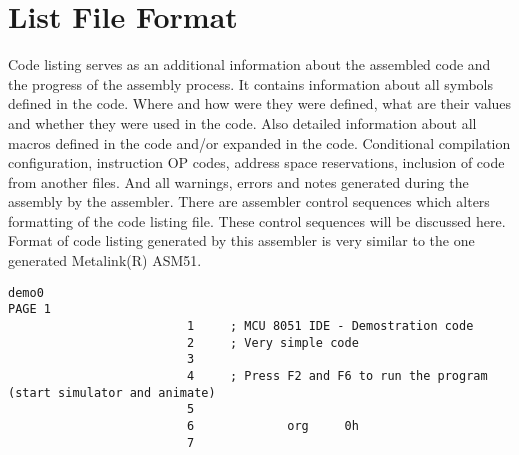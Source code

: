 {        \section{List File Format}
                Code listing serves as an additional information about the assembled code and the progress of the assembly process. It contains information about all symbols defined in the code. Where and how were they were defined, what are their values and whether they were used in the code. Also detailed information about all macros defined in the code and/or expanded in the code. Conditional compilation configuration, instruction OP codes, address space reservations, inclusion of code from another files. And all warnings, errors and notes generated during the assembly by the assembler. There are assembler control sequences which alters formatting of the code listing file. These control sequences will be discussed here. Format of code listing generated by this assembler is very similar to the one generated Metalink(R) ASM51.
                \begin{code}[h]
                        \mysmallfont{}
                        \verb'demo0                                                                                                                   '{\color{highlight_macro}\verb'PAGE'}\verb' '{\color{highlight_unknown_base}\verb'1'}\\
                        {\color{highlight_lst_line}\verb'                         1'}\verb'     '{\color{highlight_comment}\verb'; MCU 8051 IDE - Demostration code'}\\
                        {\color{highlight_lst_line}\verb'                         2'}\verb'     '{\color{highlight_comment}\verb'; Very simple code'}\\
                        {\color{highlight_lst_line}\verb'                         3'}\\
                        {\color{highlight_lst_line}\verb'                         4'}\verb'     '{\color{highlight_comment}\verb'; Press F2 and F6 to run the program (start simulator and animate)'}\\
                        {\color{highlight_lst_line}\verb'                         5'}\\
                        {\color{highlight_lst_line}\verb'                         6'}\verb'             '{\color{highlight_directive}\verb'org'}\verb'     '{\color{highlight_hex}\verb'0h'}\\
                        {\color{highlight_lst_line}\verb'                         7'}\\

\end{code}}
